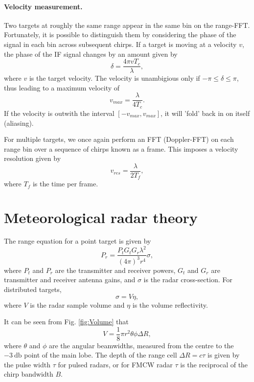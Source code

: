 \documentclass{article}
\begin{document}
\paragraph{Velocity measurement.} Two targets at roughly the same range appear in the same bin on the range-FFT. Fortunately, it is possible to distinguish them by considering the phase of the signal in each bin across subsequent chirps. If a target is moving at a velocity \(v\), the phase of the IF signal changes by an amount given by\supercite{TIFMCWDoppler}
\begin{equation}
	\delta = \frac{4 \pi v T_c}{\lambda},
\end{equation}
where \(v\) is the target velocity. The velocity is unambigious only if \(-\pi \le \delta \le \pi\), thus leading to a maximum velocity of
\begin{equation}
	v_{max} = \frac{\lambda}{4 T_c}.
\end{equation}
If the velocity is outwith the interval \([-v_{max}, v_{max}]\), it will 'fold' back in on itself (aliasing).

For multiple targets, we once again perform an FFT (Doppler-FFT)\supercite{POMRDopplerProcessing} on each range bin over a sequence of chirps known as a frame. This imposes a velocity resolution given by
\begin{equation}
	v_{res} = \frac{\lambda}{2 T_f},
\end{equation}
where \(T_f\) is the time per frame.

\section{Meteorological radar theory}
The range equation for a point target is given by
\begin{equation}
	P_r = \frac{P_t G_t G_r \lambda^2}{(4 \pi)^3 r^4} \sigma, \label{eqn:PointTarget}
\end{equation}
where \(P_t\) and \(P_r\) are the transmitter and receiver powers, \(G_t\) and \(G_r\) are transmitter and receiver antenna gains, and \(\sigma\) is the radar cross-section. For distributed targets,
\begin{equation}
	\sigma = V \eta,
\end{equation}
where \(V\) is the radar sample volume and \(\eta\) is the volume reflectivity.

It can be seen from Fig. \ref{fig:Volume} that
\begin{equation}
	V = \frac{1}{8} \pi r^2 \theta \phi \Delta R,
\end{equation}
where \(\theta\) and \(\phi\) are the angular beamwidths, measured from the centre to the \(-\SI{3}{\decibel}\) point of the main lobe. The depth of the range cell \(\Delta R = c\tau\) is given by the pulse width \(\tau\) for pulsed radars, or for FMCW radar \(\tau\) is the reciprocal of the chirp bandwidth \(B\).\supercite{Gorka}
\end{document}
